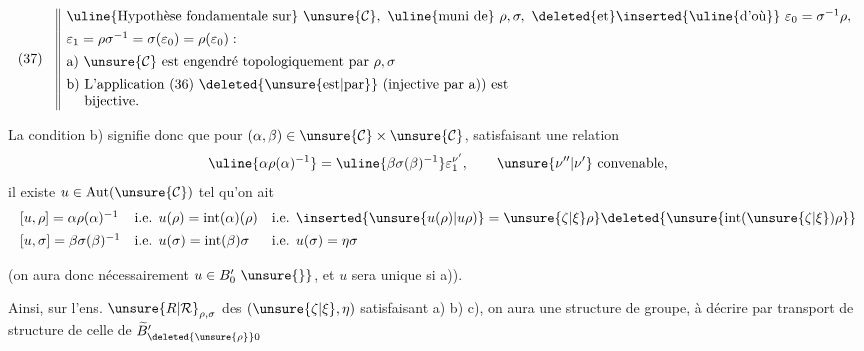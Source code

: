 
\[
(37)\quad
\begin{array}{||l}
\text{\uline{Hypothèse fondamentale sur} }\unsure{\mathcal{C}},\ 
\text{\uline{muni de} }\rho,\sigma,\ 
\text{\deleted{et}\inserted{\uline{d'où}} }\varepsilon_0=\sigma^{-1}\rho,\\[1ex]
\varepsilon_1=\rho\sigma^{-1}=\sigma(\varepsilon_0)=\rho(\varepsilon_0):\\[1ex]
\text{a) }\unsure{\mathcal{C}}\text{ est engendré topologiquement par }\rho,\sigma\\[1ex]
\text{b) L'application (36) \deleted{\unsure{est|par}} (injective par a)) est}\\
\text{\phantom{b) }bijective.}
\end{array}
\]


La condition b) signifie donc que pour
$(\alpha,\beta)\in\unsure{\mathcal{C}}\times\unsure{\mathcal{C}}$,
satisfaisant une relation
\[
\uline{\alpha\rho(\alpha)^{-1}}
=\uline{\beta\sigma(\beta)^{-1}}\varepsilon_1^{\nu'},
\qquad \unsure{\nu''|\nu'}\text{ convenable},
\]
il existe $u\in\operatorname{Aut}(\unsure{\mathcal{C}})$ tel qu'on ait
\[
\begin{array}{lll}
[u,\rho]=\alpha\rho(\alpha)^{-1}&
\text{i.e. }u(\rho)=\operatorname{int}(\alpha)(\rho)&
\text{i.e. }\inserted{\unsure{u(\rho)|u\rho)}=\unsure{\zeta|\xi}\rho}
\deleted{\unsure{\operatorname{int}(\unsure{\zeta|\xi})\rho}}\\[1ex]
[u,\sigma]=\beta\sigma(\beta)^{-1}&
\text{i.e. }u(\sigma)=\operatorname{int}(\beta)\sigma&
\text{i.e. }u(\sigma)=\eta\sigma
\end{array}
\]

\margin{$\unsure{\bullet}$}
(on aura donc nécessairement $u\in B'_0\ \unsure{\}}$, et
$u$ sera unique si  a)).

Ainsi, sur l'ens.  $\unsure{R|\mathcal{R}}_{\rho,\sigma}$ des $(\unsure{\zeta|\xi},\eta)$ satisfaisant
a) b) c), on aura une structure de groupe, à décrire par transport de structure de celle de
$\widetilde{B}'_{\deleted{\unsure{\rho}}0}$

